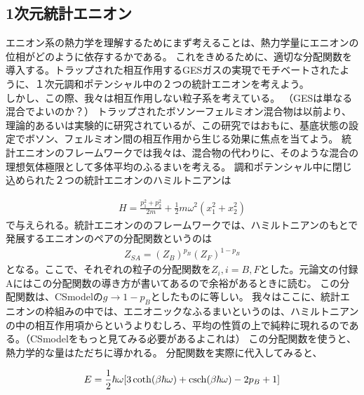 \documentclass[a4paper,11pt]{jsarticle}
\numberwithin{equation}{section}
\begin{document}
\subsection{1次元統計エニオン}
エニオン系の熱力学を理解するためにまず考えることは、熱力学量にエニオンの位相がどのように依存するかである。
これをきめるために、適切な分配関数を導入する。トラップされた相互作用するGESガスの実現でモチベートされたように、１次元調和ポテンシャル中の２つの統計エニオンを考えよう。\\
しかし、この際、我々は相互作用しない粒子系を考えている。
（GESは単なる混合でよいのか？）
トラップされたボソンーフェルミオン混合物は以前より、理論的あるいは実験的に研究されているが、この研究ではおもに、基底状態の設定でボソン、フェルミオン間の相互作用から生じる効果に焦点を当てよう。
統計エニオンのフレームワークでは我々は、混合物の代わりに、そのような混合の理想気体極限として多体平均のふるまいを考える。
調和ポテンシャル中に閉じ込められた２つの統計エニオンのハミルトニアンは

\begin{align}
H=\frac{p_1^2+p_2^2}{2m}+\frac{1}{2}m\omega^2(x_1^2+x_2^2)
\end{align}
で与えられる。統計エニオンののフレームワークでは、ハミルトニアンのもとで発展するエニオンのペアの分配関数というのは
\begin{align}
Z_{SA}=(Z_B)^{p_B}(Z_F)^{1-p_B}
\end{align}
となる。ここで、それぞれの粒子の分配関数を$Z_i,i=B,F$とした。元論文の付録Aにはこの分配関数の導き方が書いてあるので余裕があるときに読む。
この分配関数は、CSmodelの$g\rightarrow1-p_B$としたものに等しい。
我々はここに、統計エニオンの枠組みの中では、エニオニックなふるまいというのは、ハミルトニアンの中の相互作用項からというよりむしろ、平均の性質の上で純粋に現れるのである。（CSmodelをもっと見てみる必要があるよこれは）
この分配関数を使うと、熱力学的な量はただちに導かれる。
分配関数を実際に代入してみると、

\begin{align}
E=\frac{1}{2}\hbar \omega[3\coth (\beta\hbar\omega)+\csch(\beta\hbar\omega)-2p_B+1 ]
\end{align}
\end{document}
